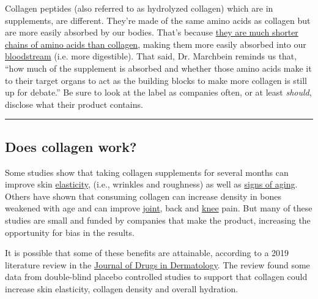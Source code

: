 Collagen peptides (also referred to as hydrolyzed collagen) which are in
supplements, are different. They're made of the same amino acids as
collagen but are more easily absorbed by our bodies. That's because
\href{https://www.furtherfood.com/difference-between-collagen-gelatin-collagen-peptides-hydrolyzed-collagen-explained-by-nutritionist/}{they
are much shorter chains of amino acids than collagen}, making them more
easily absorbed into our
\href{https://www.ncbi.nlm.nih.gov/pubmed/16076145}{bloodstream} (i.e.
more digestible). That said, Dr. Marchbein reminds us that, ``how much
of the supplement is absorbed and whether those amino acids make it to
their target organs to act as the building blocks to make more collagen
is still up for debate.'' Be sure to look at the label as companies
often, or at least \emph{should}, disclose what their product contains.

\begin{center}\rule{0.5\linewidth}{\linethickness}\end{center}

\hypertarget{does-collagen-work}{%
\subsection{Does collagen work?}\label{does-collagen-work}}

Some studies show that taking collagen supplements for several months
can improve skin
\href{https://www.ncbi.nlm.nih.gov/pubmed/26840887}{elasticity}, (i.e.,
wrinkles and roughness) as well as
\href{https://www.ncbi.nlm.nih.gov/pubmed/26362110}{signs of aging}.
Others have shown that consuming collagen can increase density in bones
weakened with age and can improve
\href{https://www.ncbi.nlm.nih.gov/pubmed/26267777}{joint}, back and
\href{https://nutritionj.biomedcentral.com/articles/10.1186/s12937-016-0130-8?utm_campaign=B2B+Website\&utm_medium=email\&_hsenc=p2ANqtz-8boAuPkblnh0HOMhfQk99V4tjBBfFKPMleWTkA7yq7T8edePwyz0iYKfdhzXSbTKHekqMS0lblBSQD0JK3Q3F_VwOChg\&_hsmi=25837964\&utm_conten}{knee}
pain. But many of these studies are small and funded by companies that
make the product, increasing the opportunity for bias in the results.

It is possible that some of these benefits are attainable, according to
a 2019 literature review in the
\href{https://jddonline.com/articles/dermatology/S1545961619P0009X/}{Journal
of Drugs in Dermatology}. The review found some data from double-blind
placebo controlled studies to support that collagen could increase skin
elasticity, collagen density and overall hydration.

